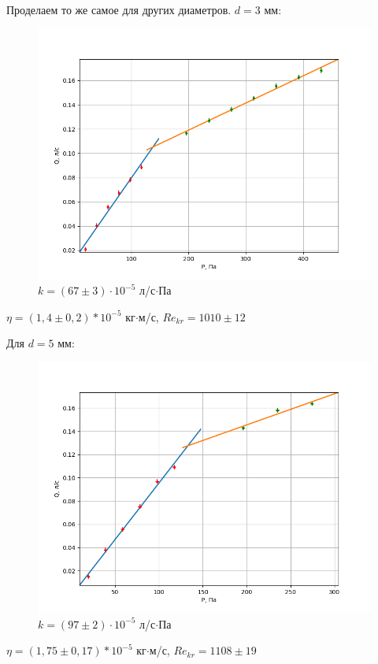 \documentclass[12pt]{article}
\begin{document}
Проделаем то же самое для других диаметров. $d = 3$ мм:
\begin{figure}[H]
	\centering
	\includegraphics[scale=0.55]{./images/d3mm1.png}
	\caption{$k = (67\pm3)\cdot 10^{-5}$ л/с$\cdot$Па}
\end{figure}
$\eta = (1,4\pm 0,2)*10^{-5}$ кг$\cdot$м/с, $Re_{kr} = 1010\pm12$

Для $d = 5$ мм:
\begin{figure}[H]
	\centering
	\includegraphics[scale=0.55]{./images/d5mm1.png}
	\caption{$k = (97\pm2)\cdot 10^{-5}$ л/с$\cdot$Па}
\end{figure}

$\eta = (1,75\pm 0,17)*10^{-5}$ кг$\cdot$м/с, $Re_{kr} = 1108\pm19$
\end{document}
